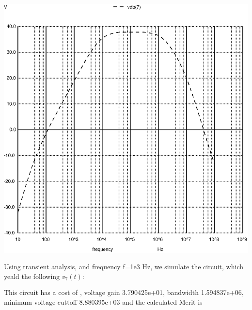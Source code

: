 \includegraphics[width=1\linewidth]{../sim/vo2f.ps}

\par

Using transient analysis, and frequency f=1e3 Hz, we simulate the circuit, which yeald the following $v_7(t)$:




This circuit has a cost of , voltage gain 3.790425e+01, bandwidth 1.594837e+06, minimum voltage cuttoff 8.880395e+03 and the  calculated Merit is 

